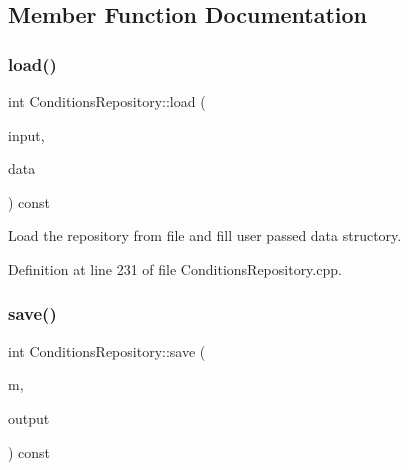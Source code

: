 \subsection{Member Function Documentation}
\hypertarget{class_d_d4hep_1_1_conditions_1_1_conditions_repository_ab7c7c5e71f45e815010151e18c8e46c2}{}\label{class_d_d4hep_1_1_conditions_1_1_conditions_repository_ab7c7c5e71f45e815010151e18c8e46c2} 
\subsubsection{\texorpdfstring{load()}{load()}}
{\footnotesize\ttfamily int Conditions\+Repository\+::load (\begin{DoxyParamCaption}\item[{const std\+::string \&}]{input,  }\item[{\hyperlink{class_d_d4hep_1_1_conditions_1_1_conditions_repository_a2a262d14363e0c6879677397dc595012}{Data} \&}]{data }\end{DoxyParamCaption}) const}



Load the repository from file and fill user passed data structory. 



Definition at line 231 of file Conditions\+Repository.\+cpp.

\hypertarget{class_d_d4hep_1_1_conditions_1_1_conditions_repository_aa2e0e36827ddbe11bb180c9eda59ace4}{}\label{class_d_d4hep_1_1_conditions_1_1_conditions_repository_aa2e0e36827ddbe11bb180c9eda59ace4} 
\subsubsection{\texorpdfstring{save()}{save()}}
{\footnotesize\ttfamily int Conditions\+Repository\+::save (\begin{DoxyParamCaption}\item[{\hyperlink{class_d_d4hep_1_1_conditions_1_1_conditions_manager}{Conditions\+Manager}}]{m,  }\item[{const std\+::string \&}]{output }\end{DoxyParamCaption}) const}



